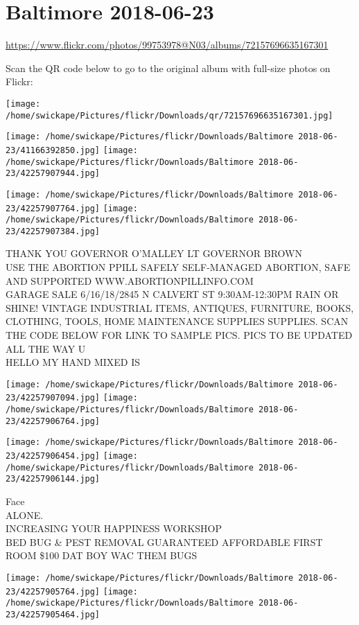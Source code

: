 \documentclass[10pt,letterpaper]{article}
\title{}
\author{}
\date{}
\begin{document}
\section*{Baltimore 2018-06-23}

\url{https://www.flickr.com/photos/99753978@N03/albums/72157696635167301}

Scan the QR code below to go to the original album with full-size photos on Flickr:

\texttt{[image: /home/swickape/Pictures/flickr/Downloads/qr/72157696635167301.jpg]}
\pagebreak

\texttt{[image: /home/swickape/Pictures/flickr/Downloads/Baltimore 2018-06-23/41166392850.jpg]}
\texttt{[image: /home/swickape/Pictures/flickr/Downloads/Baltimore 2018-06-23/42257907944.jpg]}

\texttt{[image: /home/swickape/Pictures/flickr/Downloads/Baltimore 2018-06-23/42257907764.jpg]}
\texttt{[image: /home/swickape/Pictures/flickr/Downloads/Baltimore 2018-06-23/42257907384.jpg]}

THANK YOU GOVERNOR O'MALLEY LT GOVERNOR BROWN\\
USE THE ABORTION PPILL SAFELY SELF{-}MANAGED ABORTION, SAFE AND SUPPORTED WWW.ABORTIONPILLINFO.COM\\
GARAGE SALE 6/16/18/2845 N CALVERT ST 9:30AM{-}12:30PM RAIN OR SHINE!  VINTAGE INDUSTRIAL ITEMS, ANTIQUES, FURNITURE, BOOKS, CLOTHING, TOOLS, HOME MAINTENANCE SUPPLIES SUPPLIES.  SCAN THE CODE BELOW FOR LINK TO SAMPLE PICS.  PICS TO BE UPDATED ALL THE WAY U\\
HELLO MY HAND MIXED IS
\pagebreak

\texttt{[image: /home/swickape/Pictures/flickr/Downloads/Baltimore 2018-06-23/42257907094.jpg]}
\texttt{[image: /home/swickape/Pictures/flickr/Downloads/Baltimore 2018-06-23/42257906764.jpg]}

\texttt{[image: /home/swickape/Pictures/flickr/Downloads/Baltimore 2018-06-23/42257906454.jpg]}
\texttt{[image: /home/swickape/Pictures/flickr/Downloads/Baltimore 2018-06-23/42257906144.jpg]}

Face\\
ALONE.\\
INCREASING YOUR HAPPINESS WORKSHOP\\
BED BUG \& PEST REMOVAL GUARANTEED AFFORDABLE FIRST ROOM \$100 DAT BOY WAC THEM BUGS
\pagebreak

\texttt{[image: /home/swickape/Pictures/flickr/Downloads/Baltimore 2018-06-23/42257905764.jpg]}
\texttt{[image: /home/swickape/Pictures/flickr/Downloads/Baltimore 2018-06-23/42257905464.jpg]}
\end{document}
